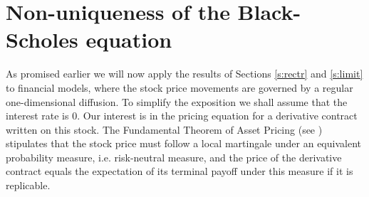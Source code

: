 \documentclass[11pt,reqno]{amsart}
\numberwithin{equation}{section}
\begin{document}
\section{Non-uniqueness of the Black-Scholes equation} \label{s:BS}
As promised earlier we will now apply the results of Sections \ref{s:rectr} and \ref{s:limit} to financial models, where the stock price movements are governed by a regular one-dimensional diffusion. To simplify the exposition we shall assume that the interest rate is $0$. Our interest is in the pricing equation for a derivative contract written on this stock. The Fundamental Theorem of Asset Pricing (see \cite{DS}) stipulates that the stock price must follow a local martingale under an equivalent probability measure, i.e. risk-neutral measure, and the price of the derivative contract equals the expectation of its terminal payoff under this measure if it is replicable.
\end{document}
